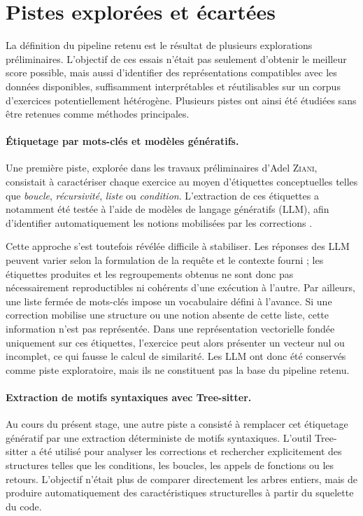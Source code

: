 \documentclass[12pt,a4paper,oneside]{report}
\begin{document}
\section{Pistes explorées et écartées}

La définition du pipeline retenu est le résultat de plusieurs explorations
préliminaires. L'objectif de ces essais n'était pas seulement d'obtenir le
meilleur score possible, mais aussi d'identifier des représentations
compatibles avec les données disponibles, suffisamment interprétables et
réutilisables sur un corpus d'exercices potentiellement hétérogène. Plusieurs
pistes ont ainsi été étudiées sans être retenues comme méthodes principales.

\paragraph{Étiquetage par mots-clés et modèles génératifs.}

Une première piste, explorée dans les travaux préliminaires d'Adel
\textsc{Ziani}, consistait à caractériser chaque exercice au moyen d'étiquettes
conceptuelles telles que \emph{boucle}, \emph{récursivité}, \emph{liste} ou
\emph{condition}. L'extraction de ces étiquettes a notamment été testée à
l'aide de modèles de langage génératifs (LLM), afin d'identifier
automatiquement les notions mobilisées par les corrections
\cite{ziani_detection_2025}.

Cette approche s'est toutefois révélée difficile à stabiliser. Les réponses
des LLM peuvent varier selon la formulation de la requête et le contexte
fourni ; les étiquettes produites et les regroupements obtenus ne sont donc
pas nécessairement reproductibles ni cohérents d'une exécution à l'autre.
Par ailleurs, une liste fermée de mots-clés impose un vocabulaire défini à
l'avance. Si une correction mobilise une structure ou une notion absente de
cette liste, cette information n'est pas représentée. Dans une représentation
vectorielle fondée uniquement sur ces étiquettes, l'exercice peut alors
présenter un vecteur nul ou incomplet, ce qui fausse le calcul de similarité.
Les LLM ont donc été conservés comme piste exploratoire, mais ils ne
constituent pas la base du pipeline retenu.

\paragraph{Extraction de motifs syntaxiques avec Tree-sitter.}

Au cours du présent stage, une autre piste a consisté à remplacer cet
étiquetage génératif par une extraction déterministe de motifs syntaxiques.
L'outil Tree-sitter a été utilisé pour analyser les corrections et rechercher
explicitement des structures telles que les conditions, les boucles, les
appels de fonctions ou les retours. L'objectif n'était plus de comparer
directement les arbres entiers, mais de produire automatiquement des
caractéristiques structurelles à partir du squelette du code.
\end{document}
